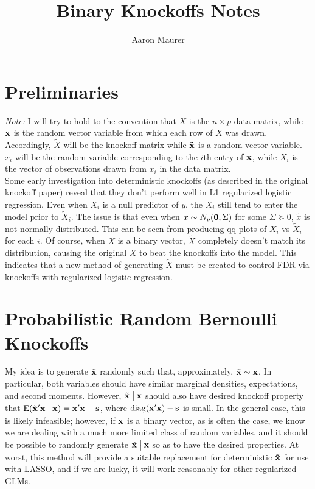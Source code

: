 \documentclass[11pt]{article}
\newcommand{\E}{\mathrm{E}}
\newcommand{\diag}{\mathrm{diag}}
\newcommand{\st}{ \; \big | \:}
\theoremstyle{definition}
\begin{document}
\title{Binary Knockoffs Notes}
\author{Aaron Maurer}
\maketitle
\section{Preliminaries} 
{\em Note:} I will try to hold to the convention that $X$ is the $n\times p$ data matrix, while $\bf x$ is the random vector variable from which each row of $X$ was drawn. Accordingly, $\tilde X$ will be the knockoff matrix while $\bf \tilde x$ is a random vector variable. $x_i$ will be the random variable corresponding to the $i$th entry of $\bf x$, while $X_i$ is the vector of observations drawn from $x_i$ in the data matrix. \\

Some early investigation into deterministic knockoffs (as described in the original knockoff paper) reveal that they don't perform well in L1 regularized logistic regression. Even when $X_i$ is a null predictor of $y$, the $X_i$ still tend to enter the model prior to $\tilde X_i$. The issue is that even when $x\sim N_p({\bf 0}, \Sigma)$ for some $\Sigma\succeq 0$, $\tilde x$ is not normally distributed. This can be seen from producing qq plots of $X_i$ vs $\tilde X_i$ for each $i$. Of course, when $X$ is a binary vector, $\tilde X$ completely doesn't match its distribution, causing the original $X$ to beat the knockoffs into the model. This indicates that a new method of generating $\tilde X$ must be created to control FDR via knockoffs with regularized logistic regression. 

\section{Probabilistic Random Bernoulli Knockoffs}
My idea is to generate $\bf \tilde x$ randomly such that, approximately, $\bf \tilde x\sim \bf x$. In particular, both variables should have similar marginal densities, expectations, and second moments. However, $\bf \tilde x\st \bf x$ should also have desired knockoff property that $\E(\bf \tilde x'\bf x\st \bf x) = \bf x'\bf x-s$, where $\diag(\bf x'\bf x)-s$ is small. In the general case, this is likely infeasible; however, if $\bf x$ is a binary vector, as is often the case, we know we are dealing with a much more limited class of random variables, and it should be possible to randomly generate $\bf \tilde x\st \bf x$ so as to have the desired properties. At worst, this method will provide a suitable replacement for deterministic $\bf \tilde x$ for use with LASSO, and if we are lucky, it will work reasonably for other regularized GLMs. 
\end{document}
